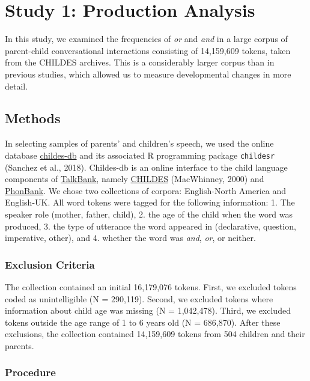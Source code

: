 \documentclass[
  ,man,floatsintext]{apa6}
\begin{document}
\hypertarget{study-1-production-analysis}{%
\section{Study 1: Production Analysis}\label{study-1-production-analysis}}

In this study, we examined the frequencies of \emph{or} and \emph{and} in a large corpus of parent-child conversational interactions consisting of 14,159,609 tokens, taken from the CHILDES archives. This is a considerably larger corpus than in previous studies, which allowed us to measure developmental changes in more detail.

\hypertarget{methods}{%
\subsection{Methods}\label{methods}}

In selecting samples of parents' and children's speech, we used the online database \href{childes-db.stanford.edu}{childes-db} and its associated R programming package \texttt{childesr} (Sanchez et al., 2018). Childes-db is an online interface to the child language components of \href{https://talkbank.org/}{TalkBank}, namely \href{https://childes.talkbank.org/}{CHILDES} (MacWhinney, 2000) and \href{https://phonbank.talkbank.org/}{PhonBank}. We chose two collections of corpora: English-North America and English-UK. All word tokens were tagged for the following information: 1. The speaker role (mother, father, child), 2. the age of the child when the word was produced, 3. the type of utterance the word appeared in (declarative, question, imperative, other), and 4. whether the word was \emph{and}, \emph{or}, or neither.

\hypertarget{exclusion-criteria}{%
\subsubsection{Exclusion Criteria}\label{exclusion-criteria}}

The collection contained an initial 16,179,076 tokens. First, we excluded tokens coded as unintelligible (N = 290,119). Second, we excluded tokens where information about child age was missing (N = 1,042,478). Third, we excluded tokens outside the age range of 1 to 6 years old (N = 686,870). After these exclusions, the collection contained 14,159,609 tokens from 504 children and their parents.

\hypertarget{procedure}{%
\subsubsection{Procedure}\label{procedure}}
\end{document}
